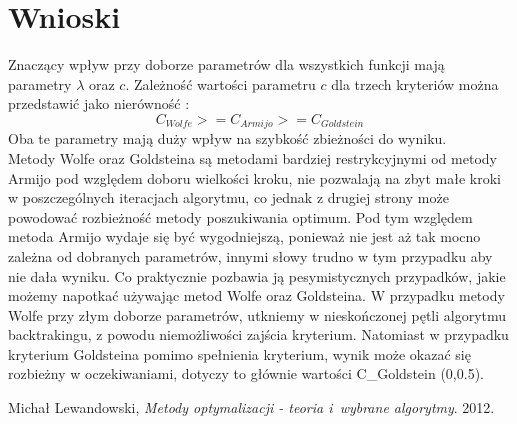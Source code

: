 \documentclass{classrep}
\begin{document}
\section{Wnioski}
Znaczący wpływ przy doborze parametrów dla wszystkich funkcji mają parametry $\lambda$ oraz $c$. Zależność wartości parametru $c$ dla trzech kryteriów można przedstawić jako nierówność :
\begin{equation}
C_{Wolfe} >= C_{Armijo} >= C_{Goldstein}
\end{equation}
Oba te parametry mają duży wpływ na szybkość zbieżności do wyniku.\\
Metody Wolfe oraz Goldsteina są metodami bardziej restrykcyjnymi od metody Armijo pod względem doboru wielkości kroku, nie pozwalają na zbyt małe kroki w poszczególnych iteracjach algorytmu, co jednak z drugiej strony może powodować rozbieżność metody poszukiwania optimum. Pod tym względem metoda Armijo wydaje się być wygodniejszą, ponieważ nie jest aż tak mocno zależna od dobranych parametrów, innymi słowy trudno w tym przypadku aby nie dała wyniku. Co praktycznie pozbawia ją pesymistycznych przypadków, jakie możemy napotkać używając metod Wolfe oraz Goldsteina. W przypadku metody Wolfe przy złym doborze parametrów, utkniemy w nieskończonej pętli algorytmu backtrakingu, z powodu niemożliwości zajścia kryterium. Natomiast w przypadku kryterium Goldsteina pomimo spełnienia kryterium, wynik może okazać się rozbieżny w oczekiwaniami, dotyczy to głównie wartości C_{Goldstein} \notin (0,0.5).


\begin{thebibliography}{9}
	Michał Lewandowski,  \emph{Metody optymalizacji - teoria i~wybrane algorytmy}.  2012.
\end{thebibliography}
\end{document}
